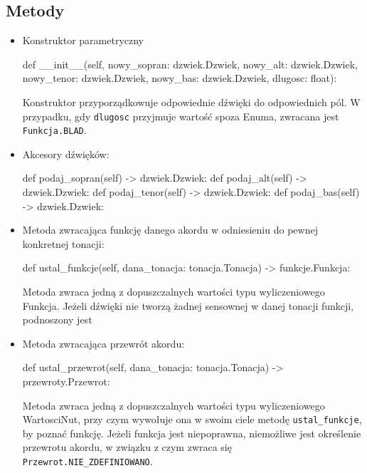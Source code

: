 \documentclass[dokumentacja.tex]{subfiles}
\begin{document}
\subsection{Metody}
\begin{itemize}
    \item Konstruktor parametryczny
        \begin{python}
    def __init__(self, nowy_sopran: dzwiek.Dzwiek, nowy_alt: dzwiek.Dzwiek, nowy_tenor: dzwiek.Dzwiek, nowy_bas: dzwiek.Dzwiek, dlugosc: float):
        \end{python}
        Konstruktor przyporządkowuje odpowiednie dźwięki do odpowiednich pól. W przypadku, gdy \texttt{dlugosc} przyjmuje wartość spoza Enuma, zwracana jest \texttt{Funkcja.BLAD}.

    \item Akcesory dźwięków:
          \begin{python}
    def podaj_sopran(self) -> dzwiek.Dzwiek:
    def podaj_alt(self) -> dzwiek.Dzwiek:
    def podaj_tenor(self) -> dzwiek.Dzwiek:
    def podaj_bas(self) -> dzwiek.Dzwiek:    
          \end{python}

    \item Metoda zwracająca funkcję danego akordu w odniesieniu do pewnej konkretnej tonacji:
        \begin{python}
     def ustal_funkcje(self, dana_tonacja: tonacja.Tonacja) -> funkcje.Funkcja:
        \end{python}
        Metoda zwraca jedną z dopuszczalnych wartości typu wyliczeniowego Funkcja. Jeżeli dźwięki nie tworzą żadnej sensownej w danej tonacji funkcji, podnoszony jest \texttt{}

    \item Metoda zwracająca przewrót akordu:
    \begin{python}
    def ustal_przewrot(self, dana_tonacja: tonacja.Tonacja) -> przewroty.Przewrot:
    \end{python}
    Metoda zwraca jedną z dopuszczalnych wartości typu wyliczeniowego WartosciNut, przy czym wywołuje ona w swoim ciele metodę \texttt{ustal\_funkcje}, by poznać funkcję. 
    Jeżeli funkcja jest niepoprawna, niemożliwe jest określenie przewrotu akordu, w związku z czym zwraca się \texttt{Przewrot.NIE\_ZDEFINIOWANO}.
\end{itemize}
\end{document}
